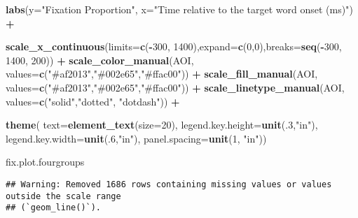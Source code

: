 \documentclass[
]{article}
\newenvironment{Shaded}{\begin{snugshade}}{\end{snugshade}}
\newcommand{\AttributeTok}[1]{\textcolor[rgb]{0.13,0.29,0.53}{#1}}
\newcommand{\DecValTok}[1]{\textcolor[rgb]{0.00,0.00,0.81}{#1}}
\newcommand{\FunctionTok}[1]{\textcolor[rgb]{0.13,0.29,0.53}{\textbf{#1}}}
\newcommand{\NormalTok}[1]{#1}
\newcommand{\SpecialCharTok}[1]{\textcolor[rgb]{0.81,0.36,0.00}{\textbf{#1}}}
\newcommand{\StringTok}[1]{\textcolor[rgb]{0.31,0.60,0.02}{#1}}
\begin{document}
\begin{Shaded}
\begin{Highlighting}[]
  \FunctionTok{labs}\NormalTok{(}\AttributeTok{y=}\StringTok{"Fixation Proportion"}\NormalTok{, }\AttributeTok{x=}\StringTok{"Time relative to the target word onset (ms)"}\NormalTok{) }\SpecialCharTok{+} 
  
  \FunctionTok{scale\_x\_continuous}\NormalTok{(}\AttributeTok{limits=}\FunctionTok{c}\NormalTok{(}\SpecialCharTok{{-}}\DecValTok{300}\NormalTok{, }\DecValTok{1400}\NormalTok{),}\AttributeTok{expand=}\FunctionTok{c}\NormalTok{(}\DecValTok{0}\NormalTok{,}\DecValTok{0}\NormalTok{),}\AttributeTok{breaks=}\FunctionTok{seq}\NormalTok{(}\SpecialCharTok{{-}}\DecValTok{300}\NormalTok{, }\DecValTok{1400}\NormalTok{, }\DecValTok{200}\NormalTok{)) }\SpecialCharTok{+}
  \FunctionTok{scale\_color\_manual}\NormalTok{(}\StringTok{\textquotesingle{}AOI\textquotesingle{}}\NormalTok{, }\AttributeTok{values=}\FunctionTok{c}\NormalTok{(}\StringTok{"\#af2013"}\NormalTok{,}\StringTok{"\#002e65"}\NormalTok{,}\StringTok{"\#ffac00"}\NormalTok{)) }\SpecialCharTok{+}
  \FunctionTok{scale\_fill\_manual}\NormalTok{(}\StringTok{\textquotesingle{}AOI\textquotesingle{}}\NormalTok{, }\AttributeTok{values=}\FunctionTok{c}\NormalTok{(}\StringTok{"\#af2013"}\NormalTok{,}\StringTok{"\#002e65"}\NormalTok{,}\StringTok{"\#ffac00"}\NormalTok{)) }\SpecialCharTok{+}
  \FunctionTok{scale\_linetype\_manual}\NormalTok{(}\StringTok{\textquotesingle{}AOI\textquotesingle{}}\NormalTok{, }\AttributeTok{values=}\FunctionTok{c}\NormalTok{(}\StringTok{"solid"}\NormalTok{,}\StringTok{"dotted"}\NormalTok{, }\StringTok{"dotdash"}\NormalTok{)) }\SpecialCharTok{+}
  
  \FunctionTok{theme}\NormalTok{(}
    \AttributeTok{text=}\FunctionTok{element\_text}\NormalTok{(}\AttributeTok{size=}\DecValTok{20}\NormalTok{),}
    \AttributeTok{legend.key.height=}\FunctionTok{unit}\NormalTok{(.}\DecValTok{3}\NormalTok{,}\StringTok{"in"}\NormalTok{),}
    \AttributeTok{legend.key.width=}\FunctionTok{unit}\NormalTok{(.}\DecValTok{6}\NormalTok{,}\StringTok{"in"}\NormalTok{),}
    \AttributeTok{panel.spacing=}\FunctionTok{unit}\NormalTok{(}\DecValTok{1}\NormalTok{, }\StringTok{"in"}\NormalTok{)) }

\NormalTok{fix.plot.fourgroups}
\end{Highlighting}
\end{Shaded}

\begin{verbatim}
## Warning: Removed 1686 rows containing missing values or values outside the scale range
## (`geom_line()`).
\end{verbatim}
\end{document}
